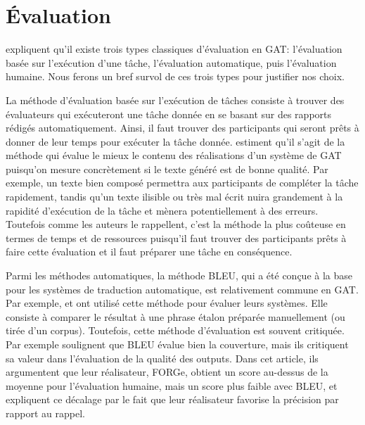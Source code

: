 
\chapter{Évaluation}\label{ch:eval}

\cite{ReiterInvestigationValidityMetrics2009} expliquent qu'il existe trois types classiques d'évaluation en \ac{GAT}: l'évaluation basée sur l'exécution d'une tâche, l'évaluation automatique, puis l'évaluation humaine. Nous ferons un bref survol de ces trois types pour justifier nos choix.

La méthode d'évaluation basée sur l'exécution de tâches consiste à trouver des évaluateurs qui exécuteront une tâche donnée en se basant sur des rapports rédigés automatiquement. Ainsi, il faut trouver des participants qui seront prêts à donner de leur temps pour exécuter la tâche donnée. \cite{ReiterInvestigationValidityMetrics2009} estiment qu'il s'agit de la méthode qui évalue le mieux le contenu des réalisations d'un système de \ac{GAT} puisqu'on mesure concrètement si le texte généré est de bonne qualité. Par exemple, un texte bien composé permettra aux participants de compléter la tâche rapidement, tandis qu'un texte ilisible ou très mal écrit nuira grandement à la rapidité d'exécution de la tâche et mènera potentiellement à des erreurs. Toutefois comme les auteurs le rappellent, c'est la méthode la plus coûteuse en termes de temps et de ressources puisqu'il faut trouver des participants prêts à faire cette évaluation et il faut préparer une tâche en conséquence.

Parmi les méthodes automatiques, la méthode BLEU, qui a été conçue à la base pour les systèmes de traduction automatique, est relativement commune en \ac{GAT}. Par exemple, \cite{Langkilde-gearyForestbasedstatisticalsentence2000} et \cite{Habash2003MatadorAL} ont utilisé cette méthode pour évaluer leurs systèmes. Elle consiste à comparer le résultat à une phrase étalon préparée manuellement (ou tirée d'un corpus). Toutefois, cette méthode d'évaluation est souvent critiquée. Par exemple \cite{DBLP:conf/semeval/MilleCBW17} soulignent que BLEU évalue bien la couverture, mais ils critiquent sa valeur dans l'évaluation de la qualité des outputs. Dans cet article, ils argumentent que leur réalisateur, FORGe, obtient un score au-dessus de la moyenne pour l'évaluation humaine, mais un score plus faible avec BLEU, et expliquent ce décalage par le fait que leur réalisateur favorise la précision par rapport au rappel.

